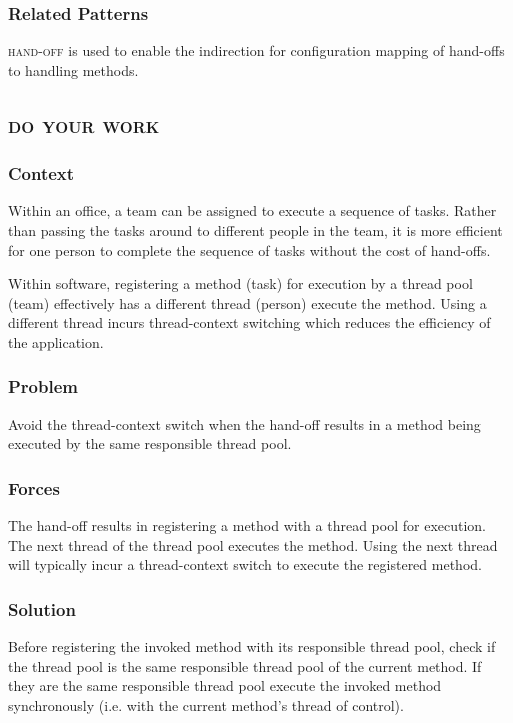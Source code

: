 \documentclass[prodmode]{style/acmlarge}
\begin{document}
\subsubsection*{Related Patterns} \textsc{hand-off} is used to enable the
indirection for configuration mapping of hand-offs to handling methods.




\subsection{\textsc{\textbf{do your work}}}

\subsubsection*{Context} Within an office, a team can be assigned to execute a
sequence of tasks.  Rather than passing the tasks around to different people in
the team, it is more efficient for one person to complete the sequence of tasks
without the cost of hand-offs.

Within software, registering a method (task) for execution by a thread pool
(team) effectively has a different thread (person) execute the method.  Using a
different thread incurs thread-context switching which reduces the efficiency of
the application.

\subsubsection*{\textbf{Problem}} Avoid the thread-context switch when the hand-off
results in a method being executed by the same responsible thread pool.

\subsubsection*{Forces} The hand-off results in registering a method with a
thread pool for execution.  The next thread of the thread pool executes the
method.  Using the next thread will typically incur a thread-context switch to
execute the registered method.

\subsubsection*{\textbf{Solution}} Before registering the invoked method with its
responsible thread pool, check if the thread pool is the same responsible thread
pool of the current method.  If they are the same responsible thread pool
execute the invoked method synchronously (i.e. with the current method's thread
of control).
\end{document}
